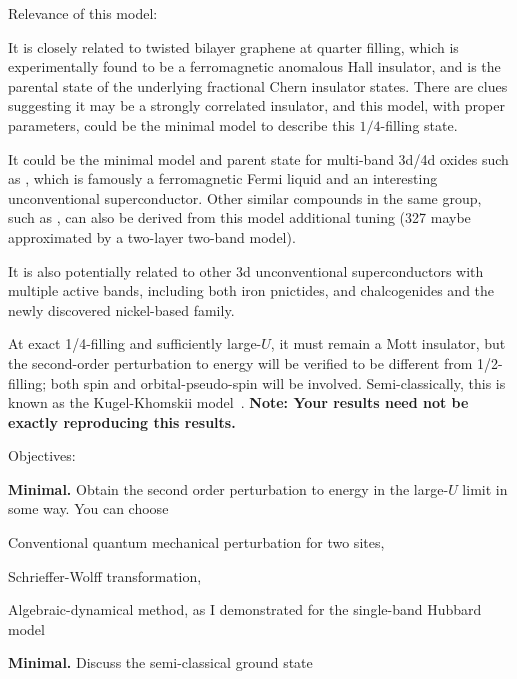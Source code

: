 \begin{problem}
  Relevance of this model:
  \begin{enumext}
    \item It is closely related to twisted bilayer graphene at quarter filling,
    which is experimentally found to be a ferromagnetic anomalous Hall
    insulator, and is the parental state of the underlying fractional Chern
    insulator states. There are clues suggesting it may be a strongly correlated
    insulator, and this model, with proper parameters, could be the minimal
    model to describe this $1/4$-filling state.
    \item It could be the minimal model and parent state for multi-band 3d/4d
    oxides such as , which is famously a ferromagnetic Fermi liquid
    and an interesting unconventional superconductor. Other similar compounds in
    the same group, such as , can also be derived from this model
    additional tuning (327 maybe approximated by a two-layer two-band model).
    \item It is also potentially related to other 3d unconventional
    superconductors with multiple active bands, including both iron pnictides,
    and chalcogenides and the newly discovered nickel-based family.
  \end{enumext}
  \begin{remark}
    At exact 1/4-filling and sufficiently large-$U$, it must remain a Mott
    insulator, but the second-order perturbation to energy will be verified to
    be different from 1/2-filling; both spin and orbital-pseudo-spin will be
    involved. Semi-classically, this is known as the Kugel-Khomskii
    model~\emph{}.
    \textbf{Note: Your results need not be exactly reproducing this results.}
  \end{remark}
  Objectives:
  \begin{enumext}[label = \Roman*.]
    \item \textbf{Minimal.} Obtain the second order perturbation to energy
    in the large-$U$ limit in some way. You can choose
    \begin{enumext}[label = (\alph*)]
      \item Conventional quantum mechanical perturbation for two sites,
      \item Schrieffer-Wolff transformation,
      \item Algebraic-dynamical method, as I demonstrated for the single-band
      Hubbard model
    \end{enumext}
    \item \textbf{Minimal.} Discuss the semi-classical ground state

\end{enumext}
\end{problem}
